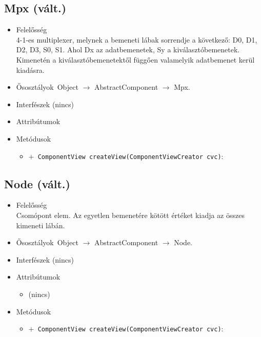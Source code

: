 \subsection{Mpx (vált.)}
\begin{itemize}
\item Felelősség\\
4-1-es multiplexer, melynek a bemeneti lábak sorrendje a következő:  D0, D1, D2, D3, S0, S1. Ahol Dx az adatbemenetek, Sy a kiválasztóbemenetek.  Kimenetén a kiválasztóbemenetektől függően valamelyik adatbemenet kerül kiadásra.
\item Ősosztályok\ Object $\rightarrow{}$ AbstractComponent $\rightarrow{}$ Mpx.
\item Interfészek (nincs)
\item Attribútumok $\ $
\item Metódusok$\ $
\begin{itemize}
	\item[] \texttt{$+$ ComponentView createView(ComponentViewCreator cvc)}: 
\end{itemize}
\end{itemize}

\subsection{Node (vált.)}
\begin{itemize}
\item Felelősség\\
Csomópont elem. Az egyetlen bemenetére kötött értéket kiadja az összes kimeneti lábán.
\item Ősosztályok\ Object $\rightarrow{}$ AbstractComponent $\rightarrow{}$ Node.
\item Interfészek (nincs)
\item Attribútumok $\ $
\begin{itemize}
\item (nincs)
\end{itemize}
\item Metódusok$\ $
\begin{itemize}
	\item[] \texttt{$+$ ComponentView createView(ComponentViewCreator cvc)}: 
\end{itemize}
\end{itemize}

